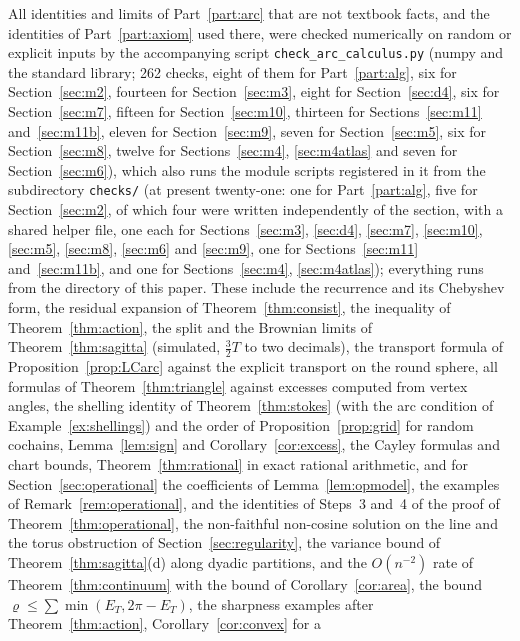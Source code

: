 \documentclass[11pt,reqno]{amsart}
\theoremstyle{definition}
\theoremstyle{remark}
\numberwithin{equation}{section}
\begin{document}
All identities and limits of Part~\ref{part:arc} that are not textbook facts, and the identities of Part~\ref{part:axiom} used there, were
checked numerically on random or explicit inputs by the accompanying script \texttt{check\_arc\_calculus.py} (numpy and the
standard library; 262 checks, eight of them for Part~\ref{part:alg}, six for Section~\ref{sec:m2}, fourteen for Section~\ref{sec:m3}, eight for Section~\ref{sec:d4}, six for Section~\ref{sec:m7}, fifteen for Section~\ref{sec:m10}, thirteen for Sections~\ref{sec:m11} and~\ref{sec:m11b}, eleven for Section~\ref{sec:m9}, seven for Section~\ref{sec:m5}, six for Section~\ref{sec:m8}, twelve for Sections~\ref{sec:m4}, \ref{sec:m4atlas} and seven for Section~\ref{sec:m6}), which also runs the module scripts registered in it from the subdirectory \texttt{checks/} (at present twenty-one: one for Part~\ref{part:alg}, five for Section~\ref{sec:m2}, of which four were written independently of the section, with a shared helper file, one each for Sections~\ref{sec:m3}, \ref{sec:d4}, \ref{sec:m7}, \ref{sec:m10}, \ref{sec:m5}, \ref{sec:m8}, \ref{sec:m6} and \ref{sec:m9}, one for Sections~\ref{sec:m11} and~\ref{sec:m11b}, and one for Sections~\ref{sec:m4}, \ref{sec:m4atlas}); everything runs
from the directory of this paper.  These include the recurrence and its Chebyshev form, the residual expansion of
Theorem~\ref{thm:consist}, the inequality of Theorem~\ref{thm:action}, the split and the Brownian limits of
Theorem~\ref{thm:sagitta} (simulated, $\tfrac32T$ to two decimals), the transport formula of
Proposition~\ref{prop:LCarc} against the explicit transport on the round sphere, all formulas of
Theorem~\ref{thm:triangle} against excesses computed from vertex angles, the shelling identity of
Theorem~\ref{thm:stokes} (with the arc condition of Example~\ref{ex:shellings}) and the order of
Proposition~\ref{prop:grid} for random cochains, Lemma~\ref{lem:sign} and Corollary~\ref{cor:excess}, the Cayley formulas
and chart bounds, Theorem~\ref{thm:rational} in exact rational arithmetic, and for Section~\ref{sec:operational} the
coefficients of Lemma~\ref{lem:opmodel}, the examples of Remark~\ref{rem:operational}, and the identities of Steps~3
and~4 of the proof of Theorem~\ref{thm:operational}, the non-faithful non-cosine solution on the line and the torus
obstruction of Section~\ref{sec:regularity}, the variance bound of Theorem~\ref{thm:sagitta}(d) along dyadic partitions, and
the $O(n^{-2})$ rate of Theorem~\ref{thm:continuum} with the bound of Corollary~\ref{cor:area}, the bound
$\varrho\le\sum\min(E_T,2\pi-E_T)$, the sharpness examples after Theorem~\ref{thm:action}, Corollary~\ref{cor:convex} for a
\end{document}
